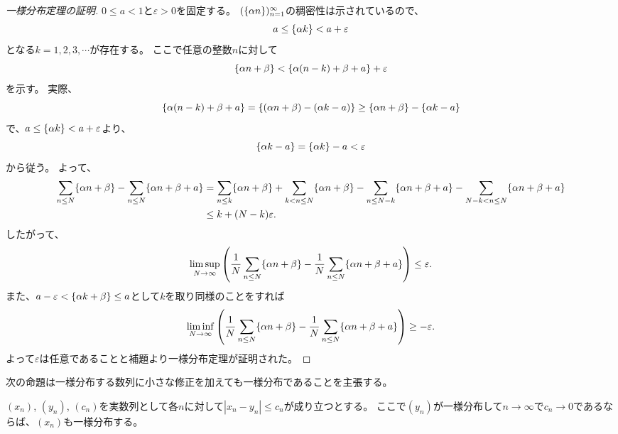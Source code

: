 \begin{proof}[一様分布定理の証明]
$0 \le a < 1$と$\varepsilon > 0$を固定する。
$(\{\alpha n\})_{n = 1}^\infty$の稠密性は示されているので、
$$
a \le \{\alpha k\} < a+\varepsilon
$$
となる$k = 1, 2, 3, \cdots$が存在する。
ここで任意の整数$n$に対して
$$
\{\alpha n+\beta\} < \{\alpha(n-k)+\beta+a\}+\varepsilon
$$
を示す。
実際、
$$
\{\alpha(n-k)+\beta+a\} = \{(\alpha n+\beta)-(\alpha k-a)\} \ge \{\alpha n+\beta\}-\{\alpha k-a\}
$$
で、$a \le \{\alpha k\} < a+\varepsilon$より、
$$
\{\alpha k-a\} = \{\alpha k\}-a < \varepsilon
$$
から従う。
よって、
$$
\begin{aligned}
\sum_{n \le N}\{\alpha n+\beta\}-\sum_{n \le N}\{\alpha n+\beta+a\}
&= \sum_{n \le k}\{\alpha n+\beta\}+\sum_{k < n \le N}\{\alpha n+\beta\}-\sum_{n \le N-k}\{\alpha n+\beta+a\}-\sum_{N-k < n \le N}\{\alpha n+\beta+a\} \\
&\le k+(N-k)\varepsilon.
\end{aligned}
$$
したがって、
$$
\limsup_{N \to \infty}\qty(\frac{1}{N}\sum_{n \le N}\{\alpha n+\beta\}-\frac{1}{N}\sum_{n \le N}\{\alpha n+\beta+a\}) \le \varepsilon.
$$
また、$a-\varepsilon < \{\alpha k+\beta\} \le a$として$k$を取り同様のことをすれば
$$
\liminf_{N \to \infty}\qty(\frac{1}{N}\sum_{n \le N}\{\alpha n+\beta\}-\frac{1}{N}\sum_{n \le N}\{\alpha n+\beta+a\}) \ge -\varepsilon.
$$
よって$\varepsilon$は任意であることと補題より一様分布定理が証明された。
\end{proof}

次の命題は一様分布する数列に小さな修正を加えても一様分布であることを主張する。

\begin{proposition}
\label{t_equidist_perturb}
$(x_n)$, $(y_n)$, $(c_n)$を実数列として各$n$に対して$|x_n-y_n| \le c_n$が成り立つとする。
ここで$(y_n)$が一様分布して$n \to \infty$で$c_n \to 0$であるならば、$(x_n)$も一様分布する。
\end{proposition}

